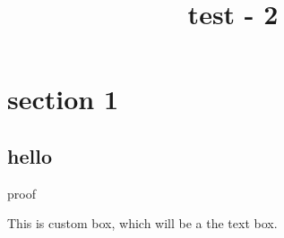 \documentclass[11pt,reqno]{amsart}
\theoremstyle{definition}
\theoremstyle{remark}
\numberwithin{equation}{section}
\renewcommand{\(}{\left(}
\renewcommand{\)}{\right)}
\newenvironment{text-box}{}{}
\newcommand{\sub}[1]{#1}
\begin{document}
\title[]
{test - 2}

\maketitle

\section{section 1}

\subsection{hello}

\sub{proof}

\begin{text-box}
    This is custom box, which will be a the text box.
\end{text-box}
\end{document}
